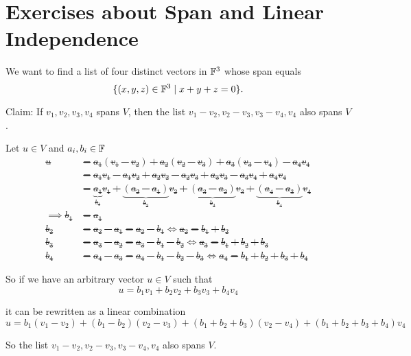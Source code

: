 \section*{Exercises about Span and Linear Independence}

\begin{xrcs}
  We want to find a list of four distinct vectors in $\mathbb{F}^3$ whose span equals
  \begin{equation}
    \{(x,y,z) \in \mathbb{F}^3 \mid x + y + z = 0 \}.
  \end{equation}
\end{xrcs}

\begin{xrcs}
  Claim: If $v_1, v_2, v_3, v_4$ spans $V$, then the list $v_1 - v_2, v_2 -v_3, v_3 -v_4, v_4$ also spans $V$.

  \begin{xprf}
    Let $u \in V$ and $a_i, b_i \in \mathbb{F}$ \st
    \[
    \begin{aligned}
      u
      &= a_1 (v_1 -v_2) + a_2 (v_2-v_3) + a_3 (v_3-v_4)-a_4 v_4 \\
      &= a_1 v_1 - a_1 v_2 + a_2v_2 - a_2 v_3 + a_3 v_3 - a_3 v_4 + a_4 v_4 \\
      &= \underbrace{a_1}_{b_1} v_1 + \underbrace{(a_2 -a_1)}_{b_2} v_2 + \underbrace{(a_3 -a_2)}_{b_3} v_3 + \underbrace{(a_4 -a_3)}_{b_4} v_4 \\
      \implies b_1 & = a_1 \\
      b_2 &= a_2 -a_1 = a_2 - b_1 \iff a_2 = b_1 + b_2 \\
      b_3 &= a_3 - a_2 = a_3 - b_1 -b_2 \iff a_3 = b_1 + b_2 + b_3 \\
      b_4 &= a_4 - a_3 = a_4 - b_1 - b_2 - b_3 \iff a_4 = b_1 + b_2 + b_3 + b_4
    \end{aligned}
    \]

    So if we have an arbitrary vector $u \in V$ such that
    \[
    u = b_1 v_1 +  b_2 v_2 + b_3 v_3 + b_4 v_4
    \]

    it can be rewritten as a linear combination
    \[
    u = b_1 (v_1 - v_2) + (b_1-b_2)(v_2-v_3) + (b_1+b_2+b_3)(v_2-v_4)+(b_1+b_2+b_3+b_4)v_4
    \]

    So the list $v_1 - v_2, v_2 -v_3, v_3 -v_4, v_4$ also spans $V$.
  \end{xprf}
\end{xrcs}


